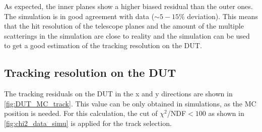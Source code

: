 As expected, the inner planes show a higher biased residual than the
outer ones. The simulation is in good agreement with data
($\sim5-15\%$ deviation). This means that the hit resolution of the
telescope planes and the amount of the multiple scatterings in the
simulation are close to reality and the simulation can be used to get
a good estimation of the tracking resolution on the DUT.




\subsection{Tracking resolution on the DUT}
\label{sec:TrackResOnDUT}

The tracking residuals on the DUT in the x and y directions are shown
in \cref{fig:DUT_MC_track}. This value can be only obtained in
simulations, as the MC position is needed. For this calculation, the
cut of $\chi^2$/NDF$<100$ as shown in \cref{fig:chi2_data_simu} is
applied for the track selection.


